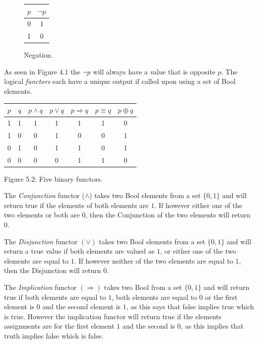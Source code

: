 \documentclass[11pt,a4paper, notitlepage]{report}
\begin{document}
\begin{figure}[H]
\centering
\label{tab:negation}
\begin{tabular}{|c|c|}
\hline
$p$ & $\neg p$\\ \hline
0 & 1 \\
1 & 0 \\
\hline
\end{tabular}
\caption{Negation.}
\end{figure}

As seen in Figure 4.1 the $\neg p$ will always have a value that is opposite $p$.
The logical \emph{functors} each have a unique output if called upon using a set of Bool elements.
\begin{center}
\begin{tabular}{|c|c||c|c|c|c|c|}
\hline
$p$ & $q$ & $p \land q$ & $p \lor q$ & $p \Rightarrow q$ & $p \equiv q$ & $p \oplus q$		\\ \hline
1 & 1 & 1 & 1 & 1 & 1 & 0\\
1 & 0 & 0 & 1 & 0 & 0 & 1\\
0 & 1 & 0 & 1 & 1 & 0 & 1\\
0 & 0 & 0 & 0 & 1 & 1 & 0\\
\hline
\end{tabular}
\end{center}
\begin{center}
\label{Figure:5.2}{Figure 5.2: Five binary functors.}
\end{center}

The \emph{Conjunction} functor ($\land$) takes two Bool elements from a set $\{0,1\}$ and will return true if the elements of both elements are $1$. If however either one of the two elements or both are $0$, then the Conjunction of the two elements will return $0$.

The \emph{Disjunction} functor $(\lor)$ takes two Bool elements from a set $\{0,1\}$ and will return a true value if both elements are valued as $1$, or either one of the two elements are equal to $1$. If however neither of the two elements are equal to $1$, then the Disjunction will return $0$.

The \emph{Implication} functor $(\Rightarrow)$ takes two Bool from a set $\{0,1\}$ and will return true if both elements are equal to $1$, both elements are equal to $0$ or the first element is $0$ and the second element is $1$, as this says that false implies true which is true. However the implication functor will return true if the elements assignments are for the first element $1$ and the second is $0$, as this implies that truth implies false which is false.
\end{document}
